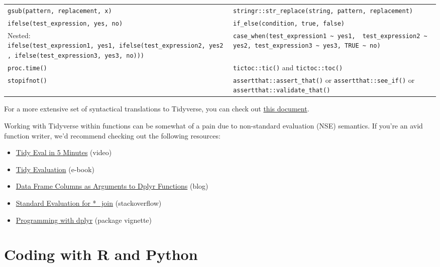 \documentclass[
]{book}
\providecommand{\tightlist}{%
  \setlength{\itemsep}{0pt}\setlength{\parskip}{0pt}}
\begin{document}
\begin{longtable}[]{@{}
  >{\raggedright\arraybackslash}p{}
  >{\raggedright\arraybackslash}p{}@{}}
\texttt{gsub(pattern,\ replacement,\ x)} & \texttt{stringr::str\_replace(string,\ pattern,\ replacement)} \\
\texttt{ifelse(test\_expression,\ yes,\ no)} & \texttt{if\_else(condition,\ true,\ false)} \\
Nested: \texttt{ifelse(test\_expression1,\ yes1,\ ifelse(test\_expression2,\ yes2,\ ifelse(test\_expression3,\ yes3,\ no)))} & \texttt{case\_when(test\_expression1\ \textasciitilde{}\ yes1,\ \ test\_expression2\ \textasciitilde{}\ yes2,\ test\_expression3\ \textasciitilde{}\ yes3,\ TRUE\ \textasciitilde{}\ no)} \\
\texttt{proc.time()} & \texttt{tictoc::tic()} and \texttt{tictoc::toc()} \\
\texttt{stopifnot()} & \texttt{assertthat::assert\_that()} or \texttt{assertthat::see\_if()} or \texttt{assertthat::validate\_that()} \\
\end{longtable}

For a more extensive set of syntactical translations to Tidyverse, you can check out \href{https://tavareshugo.github.io/data_carpentry_extras/base-r_tidyverse_equivalents/base-r_tidyverse_equivalents.html\#reshaping_data}{this document}.

Working with Tidyverse within functions can be somewhat of a pain due to non-standard evaluation (NSE) semantics. If you're an avid function writer, we'd recommend checking out the following resources:

\begin{itemize}
\tightlist
\item
  \href{https://www.youtube.com/watch?v=nERXS3ssntw}{Tidy Eval in 5 Minutes} (video)
\item
  \href{https://tidyeval.tidyverse.org/index.html}{Tidy Evaluation} (e-book)
\item
  \href{https://www.brodrigues.co/blog/2016-07-18-data-frame-columns-as-arguments-to-dplyr-functions/}{Data Frame Columns as Arguments to Dplyr Functions} (blog)
\item
  \href{https://stackoverflow.com/questions/28125816/r-standard-evaluation-for-join-dplyr}{Standard Evaluation for *\_join} (stackoverflow)
\item
  \href{https://dplyr.tidyverse.org/articles/programming.html}{Programming with dplyr} (package vignette)
\end{itemize}

\section{Coding with R and Python}\label{coding-with-r-and-python}
\end{document}
